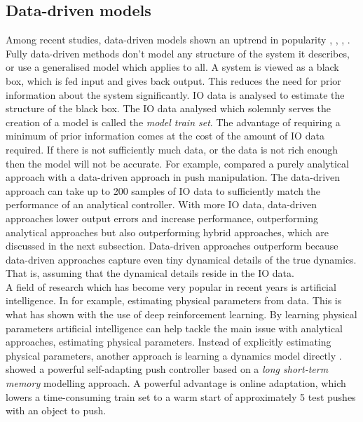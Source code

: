 \subsection{Data-driven models}
\label{subsection: data_driven_models}
Among recent studies, data-driven models shown an uptrend in popularity \cite{mericli_push-manipulation_2015},
\cite{bauza_data-efficient_2018},  \cite{stuber_feature-based_2018}, \cite{stuber_lets_2020}. Fully data-driven methods don't model any structure of the system it describes, or use a generalised model which applies to all. A system is viewed as a black box, which is fed input and gives back output. This reduces the need for prior information about the system significantly. \ac{IO} data is analysed to estimate the structure of the black box. The \ac{IO} data analysed which solemnly serves the creation of a model is called the \textit{model train set}. The advantage of requiring a minimum of prior information comes at the cost of the amount of \ac{IO} data required. If there is not sufficiently much data, or the data is not rich enough then the model will not be accurate. For example, \cite{bauza_data-efficient_2018} compared a purely analytical approach with a data-driven approach in push manipulation. The data-driven approach can take up to 200 samples of \ac{IO} data to sufficiently match the performance of an analytical controller. With more \ac{IO} data, data-driven approaches lower output errors and increase performance, outperforming analytical approaches but also outperforming hybrid approaches, which are discussed in the next subsection. Data-driven approaches outperform because data-driven approaches capture even tiny dynamical details of the true dynamics. That is, assuming that the dynamical details reside in the \ac{IO} data. \\

A field of research which has become very popular in recent years is artificial intelligence. In for example, estimating physical parameters from data. This is what \cite{denil_learning_2017} has shown with the use of deep reinforcement learning. By learning physical parameters artificial intelligence can help tackle the main issue with analytical approaches, estimating physical parameters. Instead of explicitly estimating physical parameters, another approach is learning a dynamics model directly \cite{stuber_lets_2020}. \cite{cong_self-adapting_2020} showed a powerful self-adapting push controller based on a \textit{long short-term memory} modelling approach. A powerful advantage is online adaptation, which lowers a time-consuming train set to a warm start of approximately 5 test pushes with an object to push. \\

